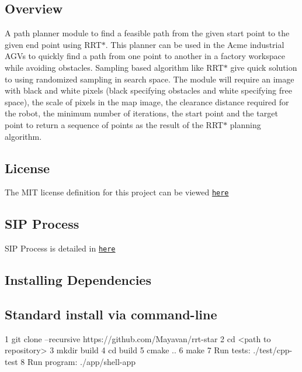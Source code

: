 \href{https://travis-ci.org/Mayavan/rrt-star}{\tt } \subsection*{\href{https://coveralls.io/github/Mayavan/rrt-star?branch=master}{\tt } }

\subsection*{Overview}

A path planner module to find a feasible path from the given start point to the given end point using R\+R\+T$\ast$. This planner can be used in the Acme industrial A\+G\+Vs to quickly find a path from one point to another in a factory workspace while avoiding obstacles. Sampling based algorithm like R\+R\+T$\ast$ give quick solution to using randomized sampling in search space. The module will require an image with black and white pixels (black specifying obstacles and white specifying free space), the scale of pixels in the map image, the clearance distance required for the robot, the minimum number of iterations, the start point and the target point to return a sequence of points as the result of the R\+R\+T$\ast$ planning algorithm.



\subsection*{License}

The M\+IT license definition for this project can be viewed \href{https://opensource.org/licenses/MIT}{\tt here} \subsection*{S\+IP Process}

S\+IP Process is detailed in \href{https://docs.google.com/spreadsheets/d/1cSA6AFp7Eeqrku6nSDFxkTTb4TWTfvhlCbPjua-hT9A/edit?usp=sharing}{\tt here}

\subsection*{Installing Dependencies}

\subsection*{Standard install via command-\/line}


\begin{DoxyCode}
1 git clone --recursive https://github.com/Mayavan/rrt-star
2 cd <path to repository>
3 mkdir build
4 cd build
5 cmake ..
6 make
7 Run tests: ./test/cpp-test
8 Run program: ./app/shell-app
\end{DoxyCode}
 